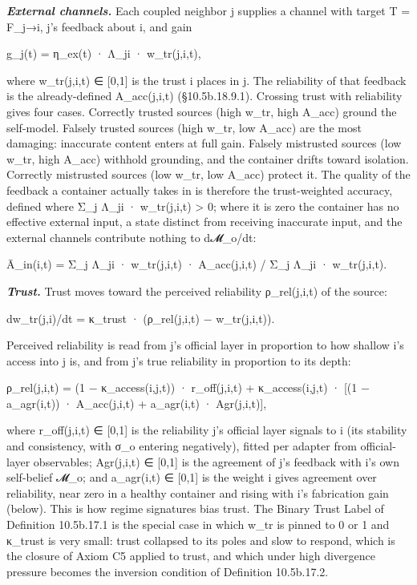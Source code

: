 \documentclass[
]{article}
\begin{document}
\emph{\textbf{External channels.}} Each coupled neighbor j supplies a
channel with target T = F\_j→i, j's feedback about i, and gain

g\_j(t) = η\_ex(t) · Λ\_ji · w\_tr(j,i,t),

where w\_tr(j,i,t) ∈ {[}0,1{]} is the trust i places in j. The
reliability of that feedback is the already-defined A\_acc(j,i,t)
(§10.5b.18.9.1). Crossing trust with reliability gives four cases.
Correctly trusted sources (high w\_tr, high A\_acc) ground the
self-model. Falsely trusted sources (high w\_tr, low A\_acc) are the
most damaging: inaccurate content enters at full gain. Falsely
mistrusted sources (low w\_tr, high A\_acc) withhold grounding, and the
container drifts toward isolation. Correctly mistrusted sources (low
w\_tr, low A\_acc) protect it. The quality of the feedback a container
actually takes in is therefore the trust-weighted accuracy, defined
where Σ\_j Λ\_ji · w\_tr(j,i,t) \textgreater{} 0; where it is zero the
container has no effective external input, a state distinct from
receiving inaccurate input, and the external channels contribute nothing
to d𝓜\_o/dt:

Ā\_in(i,t) = Σ\_j Λ\_ji · w\_tr(j,i,t) · A\_acc(j,i,t) / Σ\_j Λ\_ji ·
w\_tr(j,i,t).

\emph{\textbf{Trust.}} Trust moves toward the perceived reliability
ρ\_rel(j,i,t) of the source:

dw\_tr(j,i)/dt = κ\_trust · (ρ\_rel(j,i,t) − w\_tr(j,i,t)).

Perceived reliability is read from j's official layer in proportion to
how shallow i's access into j is, and from j's true reliability in
proportion to its depth:

ρ\_rel(j,i,t) = (1 − κ\_access(i,j,t)) · r\_off(j,i,t) +
κ\_access(i,j,t) · {[}(1 − a\_agr(i,t)) · A\_acc(j,i,t) + a\_agr(i,t) ·
Agr(j,i,t){]},

where r\_off(j,i,t) ∈ {[}0,1{]} is the reliability j's official layer
signals to i (its stability and consistency, with σ\_o entering
negatively), fitted per adapter from official-layer observables;
Agr(j,i,t) ∈ {[}0,1{]} is the agreement of j's feedback with i's own
self-belief 𝓜\_o; and a\_agr(i,t) ∈ {[}0,1{]} is the weight i gives
agreement over reliability, near zero in a healthy container and rising
with i's fabrication gain (below). This is how regime signatures bias
trust. The Binary Trust Label of Definition 10.5b.17.1 is the special
case in which w\_tr is pinned to 0 or 1 and κ\_trust is very small:
trust collapsed to its poles and slow to respond, which is the closure
of Axiom C5 applied to trust, and which under high divergence pressure
becomes the inversion condition of Definition 10.5b.17.2.
\end{document}
